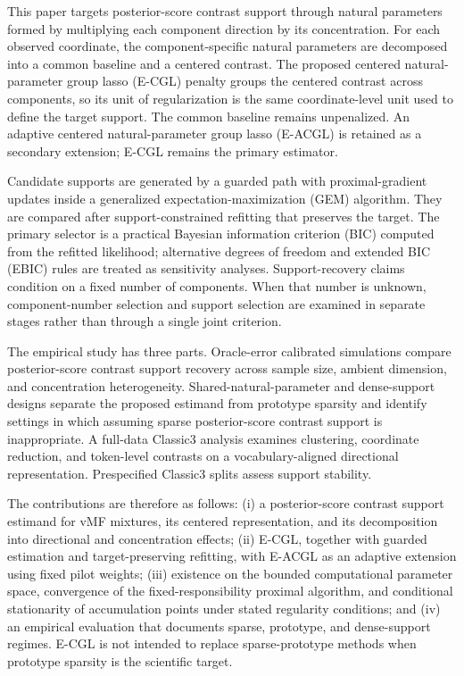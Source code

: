 \documentclass[preprint,12pt,authoryear]{elsarticle}
\newcounter{algorithm}
\begin{document}
This paper targets posterior-score contrast support through natural parameters
formed by multiplying each component direction by its concentration. For each
observed coordinate, the component-specific natural parameters are decomposed
into a common baseline and a centered contrast. The proposed centered
natural-parameter group lasso (E-CGL) penalty
groups the centered contrast across components, so its unit of regularization
is the same coordinate-level unit used to define the target support. The common
baseline remains unpenalized. An adaptive centered natural-parameter group
lasso (E-ACGL) is retained as a secondary extension; E-CGL remains the primary
estimator.

Candidate supports are generated by a guarded path with proximal-gradient
updates inside a generalized expectation-maximization (GEM) algorithm. They
are compared after support-constrained
refitting that preserves the target.
The primary selector is a practical Bayesian information criterion (BIC)
computed from the refitted likelihood; alternative degrees of freedom and
extended BIC (EBIC) rules are treated as sensitivity
analyses. Support-recovery claims condition on a fixed number of components.
When that number is unknown, component-number selection and support selection
are examined in separate stages rather than through a single joint criterion.

The empirical study has three parts. Oracle-error calibrated simulations
compare posterior-score contrast support recovery across sample size, ambient
dimension, and concentration heterogeneity. Shared-natural-parameter and
dense-support designs separate the proposed estimand from prototype sparsity
and identify settings in which assuming sparse posterior-score contrast
support is inappropriate. A full-data Classic3
analysis examines clustering, coordinate reduction, and token-level contrasts
on a vocabulary-aligned directional representation. Prespecified Classic3
splits assess support stability.

The contributions are therefore as follows: (i) a posterior-score contrast support
estimand for vMF mixtures, its centered representation, and its decomposition
into directional and concentration effects; (ii) E-CGL, together with guarded
estimation and target-preserving refitting, with E-ACGL as an adaptive
extension using fixed pilot weights;
(iii) existence on the bounded computational parameter space, convergence of
the fixed-responsibility proximal algorithm, and conditional stationarity of
accumulation points under stated regularity conditions; and
(iv) an empirical evaluation that documents sparse, prototype, and
dense-support regimes.
E-CGL is not intended to replace sparse-prototype methods when prototype
sparsity is the scientific target.
\end{document}
